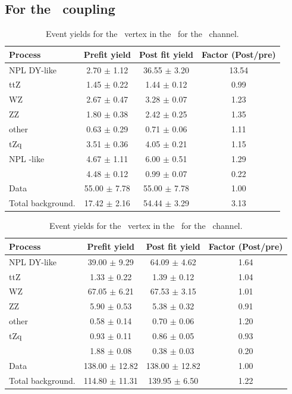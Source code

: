 \subsection*{For the \Zut\ coupling}
  \begin{table}[htbp]
	\centering
	\caption{Event yields for the \Zut\ vertex in the \STSR\  for the \mumumu\ channel. }
	\begin{tabular} {l c c c }
		\toprule
		Process & Prefit yield & Post fit yield & Factor (Post/pre) \\
		\midrule
		NPL DY-like & 2.70 $ \pm $ 1.12 & 36.55 $ \pm $ 3.20 & 13.54 \\ 
		ttZ & 1.45 $ \pm $ 0.22 & 1.44 $ \pm $ 0.12 & 0.99 \\ 
		WZ & 2.67 $ \pm $ 0.47 & 3.28 $ \pm $ 0.07 & 1.23 \\ 
		ZZ & 1.80 $ \pm $ 0.38 & 2.42 $ \pm $ 0.25 & 1.35 \\ 
		other & 0.63 $ \pm $ 0.29 & 0.71 $ \pm $ 0.06 & 1.11 \\ 
		tZq & 3.51 $ \pm $ 0.36 & 4.05 $ \pm $ 0.21 & 1.15 \\ 
		NPL \ttbar-like & 4.67 $ \pm $ 1.11 & 6.00 $ \pm $ 0.51 & 1.29\\
		\kZut  & 4.48 $ \pm $ 0.12 & 0.99 $ \pm $ 0.07 & 0.22\\
		\hdashline
		Data & 55.00 $ \pm $ 7.78 & 55.00 $ \pm $ 7.78 & 1.00\\
		Total background. & 17.42 $ \pm $ 2.16 & 54.44 $ \pm $ 3.29 & 3.13\\
		\bottomrule
	\end{tabular}
\end{table}
\begin{table}[htbp]
	\centering
	\caption{Event yields for the \Zut\ vertex in the \WZCR\  for the \eee\ channel. }
	\begin{tabular} {l c c c }
		\toprule
		Process & Prefit yield & Post fit yield & Factor (Post/pre) \\
		\midrule
		NPL DY-like & 39.00 $ \pm $ 9.29 & 64.09 $ \pm $ 4.62 & 1.64 \\ 
		ttZ & 1.33 $ \pm $ 0.22 & 1.39 $ \pm $ 0.12 & 1.04 \\ 
		WZ & 67.05 $ \pm $ 6.21 & 67.53 $ \pm $ 3.15 & 1.01 \\ 
		ZZ & 5.90 $ \pm $ 0.53 & 5.38 $ \pm $ 0.32 & 0.91 \\ 
		other & 0.58 $ \pm $ 0.14 & 0.70 $ \pm $ 0.06 & 1.20 \\ 
		tZq & 0.93 $ \pm $ 0.11 & 0.86 $ \pm $ 0.05 & 0.93 \\ 
		\kZut  & 1.88 $ \pm $ 0.08 & 0.38 $ \pm $ 0.03 & 0.20\\
		\hdashline
		Data & 138.00 $ \pm $ 12.82 & 138.00 $ \pm $ 12.82 & 1.00\\
		Total background. & 114.80 $ \pm $ 11.31 & 139.95 $ \pm $ 6.50 & 1.22\\
		\bottomrule
	\end{tabular}
\end{table}
